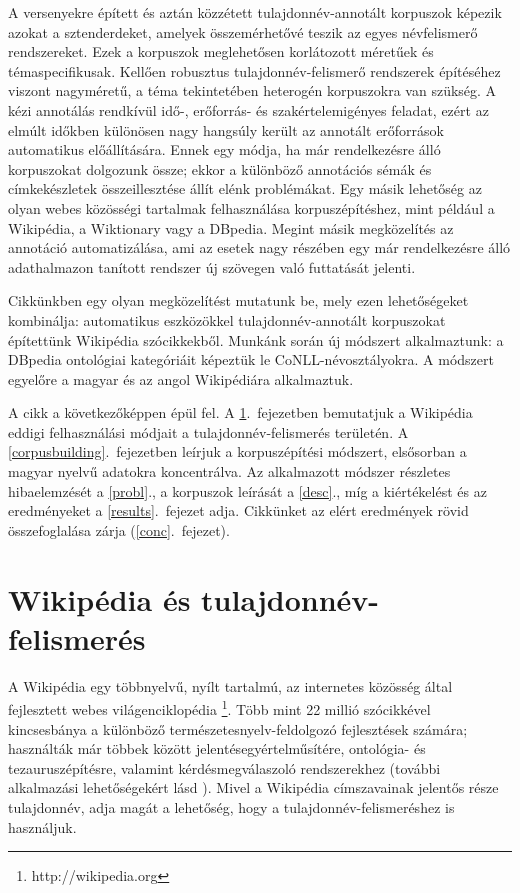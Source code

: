 \documentclass{llncs}
\begin{document}
A versenyekre épített és aztán közzétett tulajdonnév-annotált korpuszok képezik azokat a sztenderdeket, amelyek összemérhetővé teszik az egyes névfelismerő rendszereket. Ezek a korpuszok meglehetősen korlátozott méretűek és témaspecifikusak. Kellően robusztus tulajdonnév-felismerő rendszerek építéséhez viszont nagyméretű, a téma tekintetében heterogén korpuszokra van szükség. A kézi annotálás rendkívül idő-, erőforrás- és szakértelemigényes feladat, ezért az elmúlt időkben különösen nagy hangsúly került az annotált erőforrások automatikus előállítására. Ennek egy módja, ha már rendelkezésre álló korpuszokat dolgozunk össze; ekkor a különböző annotációs sémák és címkekészletek összeillesztése állít elénk problémákat. Egy másik lehetőség az olyan webes közösségi tartalmak felhasználása korpuszépítéshez, mint például a Wikipédia, a Wiktionary vagy a DBpedia. Megint másik megközelítés az annotáció automatizálása, ami az esetek nagy részében egy már rendelkezésre álló adathalmazon tanított rendszer új szövegen való futtatását jelenti. 

Cikkünkben egy olyan megközelítést mutatunk be, mely ezen lehetőségeket kombinálja: automatikus eszközökkel tulajdonnév-annotált korpuszokat építettünk Wikipédia szócikkekből. Munkánk során új módszert alkalmaztunk: a DBpedia ontológiai kategóriáit képeztük le CoNLL-névosztályokra. A módszert egyelőre a magyar és az angol Wikipédiára alkalmaztuk. 

A cikk a következőképpen épül fel. A \ref{wiki:ner}.~fejezetben bemutatjuk a Wikipédia eddigi felhasználási módjait a tulajdonnév-felismerés területén. A \ref{corpusbuilding}.~fejezetben leírjuk a korpuszépítési módszert, elsősorban a magyar nyelvű adatokra koncentrálva. Az alkalmazott módszer részletes hibaelemzését a \ref{probl}., a korpuszok leírását a \ref{desc}., míg a kiértékelést és az eredményeket a \ref{results}.~fejezet adja. Cikkünket az elért eredmények rövid összefoglalása zárja (\ref{conc}.~fejezet). 


\section{Wikipédia és tulajdonnév-felismerés}
\label{wiki:ner}

A Wikipédia egy többnyelvű, nyílt tartalmú, az internetes közösség által fejlesztett webes világenciklopédia \footnote{http://wikipedia.org}. Több mint 22 millió szócikkével kincsesbánya a különböző természetesnyelv-feldolgozó fejlesztések számára; használták már többek között jelentésegyértelműsítére, ontológia- és tezauruszépítésre, valamint kérdésmegválaszoló rendszerekhez (további alkalmazási lehetőségekért lásd \cite{Medelyan:09}). Mivel a Wikipédia címszavainak jelentős része tulajdonnév, adja magát a lehetőség, hogy a tulajdonnév-felismeréshez is használjuk. 
\end{document}
